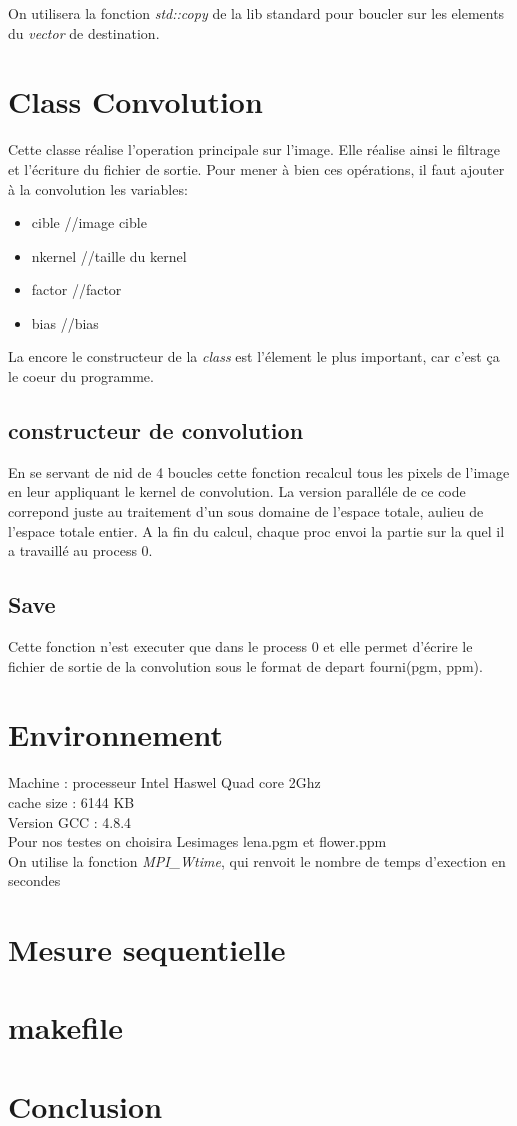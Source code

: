 On utilisera  la fonction {\it std::copy} de la lib standard pour boucler sur les elements du {\it vector} de
destination.

\section{Class Convolution}
Cette classe réalise l'operation principale sur l'image. Elle réalise ainsi le filtrage et l'écriture du fichier
de sortie.
Pour mener \`a bien ces opérations, il faut ajouter à la convolution les variables:
\begin{itemize}
\item cible   //image cible
\item nkernel //taille du kernel
\item factor  //factor
\item bias    //bias	
\end{itemize}

La encore le constructeur de la {\it class} est l'élement le plus important, car c'est ça le coeur du programme.

\subsection{constructeur de convolution}
En se servant de nid de 4 boucles cette fonction recalcul tous les pixels de l'image en leur appliquant le kernel de convolution.
La version paralléle de ce code correpond juste au traitement d'un sous domaine de l'espace totale, aulieu de l'espace totale
entier. A la fin du calcul, chaque proc envoi la partie sur la  quel il a travaillé au process 0.
  

\subsection{Save}
Cette fonction n'est executer que dans le process 0 et elle permet d'écrire le fichier de sortie de la convolution 
sous le format de depart fourni(pgm, ppm).


\section{Environnement}
Machine : processeur Intel Haswel Quad core 2Ghz\\
		  cache size : 6144 KB \\	
		  Version GCC : 4.8.4\\
		  		
Pour nos testes on choisira Lesimages lena.pgm et flower.ppm  \\
On  utilise la fonction {\it MPI\_Wtime}, qui renvoit le nombre de temps d'exection en secondes

\section{Mesure sequentielle}


\section{makefile}



\section{Conclusion}








